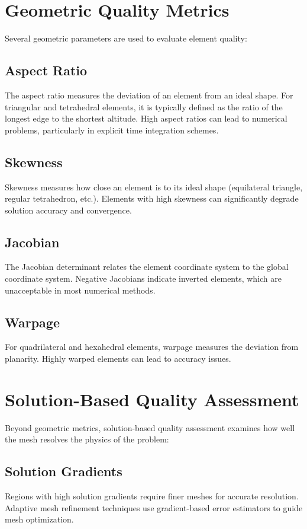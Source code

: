 \documentclass{book}
\begin{document}
\begin{itemize}[leftmargin=*,label=\textbullet]
\section{Geometric Quality Metrics}

Several geometric parameters are used to evaluate element quality:

\subsection{Aspect Ratio}
The aspect ratio measures the deviation of an element from an ideal shape. For triangular and tetrahedral elements, it is typically defined as the ratio of the longest edge to the shortest altitude. High aspect ratios can lead to numerical problems, particularly in explicit time integration schemes.

\subsection{Skewness}
Skewness measures how close an element is to its ideal shape (equilateral triangle, regular tetrahedron, etc.). Elements with high skewness can significantly degrade solution accuracy and convergence.

\subsection{Jacobian}
The Jacobian determinant relates the element coordinate system to the global coordinate system. Negative Jacobians indicate inverted elements, which are unacceptable in most numerical methods.

\subsection{Warpage}
For quadrilateral and hexahedral elements, warpage measures the deviation from planarity. Highly warped elements can lead to accuracy issues.

\section{Solution-Based Quality Assessment}

Beyond geometric metrics, solution-based quality assessment examines how well the mesh resolves the physics of the problem:

\subsection{Solution Gradients}
Regions with high solution gradients require finer meshes for accurate resolution. Adaptive mesh refinement techniques use gradient-based error estimators to guide mesh optimization.


\end{itemize}
\end{document}
